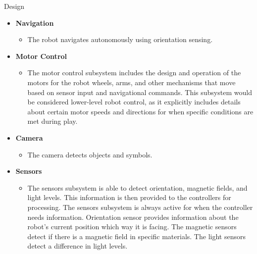 \documentclass[final]{beamer}
\newlength{\colwidth}
\begin{document}
\begin{frame}[t]
\begin{columns}[t]
\begin{column}{\colwidth}
  \begin{block}{Design}
    \begin{itemize}
    
      \item \textbf{Navigation}
        \begin{itemize}
          \item The robot navigates autonomously using orientation sensing.
        \end{itemize}
        
      \item \textbf{Motor Control}
        \begin{itemize}
          \item The motor control subsystem includes the design and operation of the motors for the robot wheels, arms, and other mechanisms that move based on sensor input and navigational commands. This subsystem would be considered lower-level robot control, as it explicitly includes details about certain motor speeds and directions for when specific conditions are met during play.
        \end{itemize}
      
      \item \textbf{Camera}
        \begin{itemize}
          \item The camera detects objects and symbols.
        \end{itemize}
      
      \item \textbf{Sensors}
        \begin{itemize}
          \item The sensors subsystem is able to detect orientation, magnetic fields, and light levels. This information is then provided to the controllers for processing. The sensors subsystem is always active for when the controller needs information. Orientation sensor provides information about the robot's current position which way it is facing. The magnetic sensors detect if there is a magnetic field in specific materials. The light sensors detect a difference in light levels.
        \end{itemize}
    
    \end{itemize}
  
  \end{block}




\end{column}
\end{columns}
\end{frame}
\end{document}
